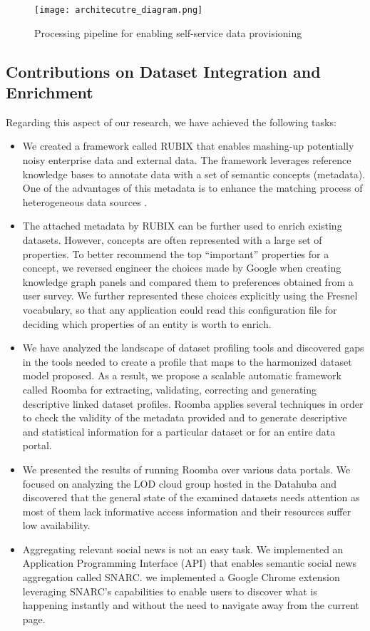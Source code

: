 \begin{figure}[!ht]
  \centering
  \texttt{[image: architecutre\_diagram.png]}
  \caption{Processing pipeline for enabling self-service data provisioning}
  \label{fig:architecutre_diagram}
\end{figure}

\subsection{Contributions on Dataset Integration and Enrichment}
Regarding this aspect of our research, we have achieved the following tasks:
 \begin{itemize}
  \item We created a framework called RUBIX that enables mashing-up potentially noisy enterprise data and external data. The framework leverages reference knowledge bases to annotate data with a set of semantic concepts (metadata). One of the advantages of this metadata is to enhance the matching process of heterogeneous data sources .
	\item The attached metadata by RUBIX can be further used to enrich existing datasets. However, concepts are often represented with a large set of properties. To better recommend the top ``important'' properties for a concept, we reversed engineer the choices made by Google when creating knowledge graph panels and compared them to preferences obtained from a user survey. We further represented these choices explicitly using the Fresnel vocabulary, so that any application could read this configuration file for deciding which properties of an entity is worth to enrich.
	\item We have analyzed the landscape of dataset profiling tools and discovered gaps in the tools needed to create a profile that maps to the harmonized dataset model proposed. As a result, we propose a scalable automatic framework called Roomba for extracting, validating, correcting and generating descriptive linked dataset profiles. Roomba applies several techniques in order to check the validity of the metadata provided and to generate descriptive and statistical information for a particular dataset or for an entire data portal.
	\item We presented the results of running Roomba over various data portals. We focused on analyzing the LOD cloud group hosted in the Datahuba and discovered that the general state of the examined datasets needs attention as most of them lack informative access information and their resources suffer low availability.
	\item Aggregating relevant social news is not an easy task. We implemented an Application Programming Interface (API) that enables semantic social news aggregation called SNARC. we implemented a Google Chrome extension leveraging SNARC's capabilities to enable users to discover what is happening instantly and without the need to navigate away from the current page.
\end{itemize}

